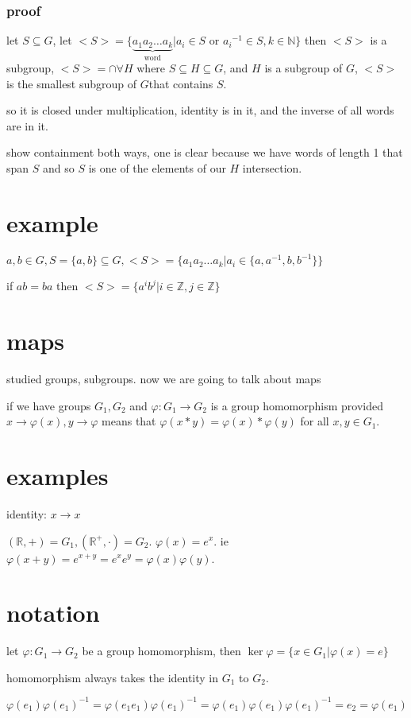 \documentclass[letterpaper]{article}
\begin{document}
\subsubsection*{proof}
let $S\subseteq G$, let $<S>=\{\underbrace{a_1a_2\dots a_k}_{\text{word}}|a_i\in S\text{ or }{a_i}^{-1}\in S, k\in \mathbb{N}\}$ then $<S>$ is a subgroup, $<S>=\cap \forall H$ where $S\subseteq H\subseteq G$, and $H$ is a subgroup of $G$, $<S>$ is the smallest subgroup of $G$that contains $S$.

so it is closed under multiplication, identity is in it, and the inverse of all words are in it.

show containment both ways, one is clear because we have words of length 1 that span $S$ and so $S$ is one of the elements of our $H$ intersection.

\section*{example}
$a,b\in G, S=\{a,b\}\subseteq G, <S>=\{a_1a_2\dots a_k|a_i\in\{a,a^{-1},b,b^{-1}\}\}$

if $ab=ba$ then $<S>=\{a^{i}b^{j}|i\in \mathbb{Z}, j\in \mathbb{Z}\}$


\section*{maps}
studied groups, subgroups. now we are going to talk about maps

if we have groups $G_1,G_2$ and $\varphi:G_1\to G_2$ is a group homomorphism provided $x\to\varphi(x), y\to\varphi$ means that $\varphi(x*y)=\varphi(x)*\varphi(y)$ for all $x,y\in G_1$.
\section*{examples}
identity: $x\to x$

$(\mathbb{R},+)=G_1, (\mathbb{R}^+,\cdot)=G_2$. $\varphi(x)=e^x$. ie $\varphi(x+y)=e^{x+y}=e^xe^y=\varphi(x)\varphi(y)$.

\section*{notation}
let $\varphi:G_1\to G_2$ be a group homomorphism, then $\ker\varphi=\{x\in G_1|\varphi(x)=e\}$

homomorphism always takes the identity in $G_1$ to $G_2$.

$\varphi(e_1)\varphi(e_1)^{-1}=\varphi(e_1e_1)\varphi(e_1)^{-1}=\varphi(e_1)\varphi(e_1)\varphi(e_1)^{-1}=e_2=\varphi(e_1)$
\end{document}
